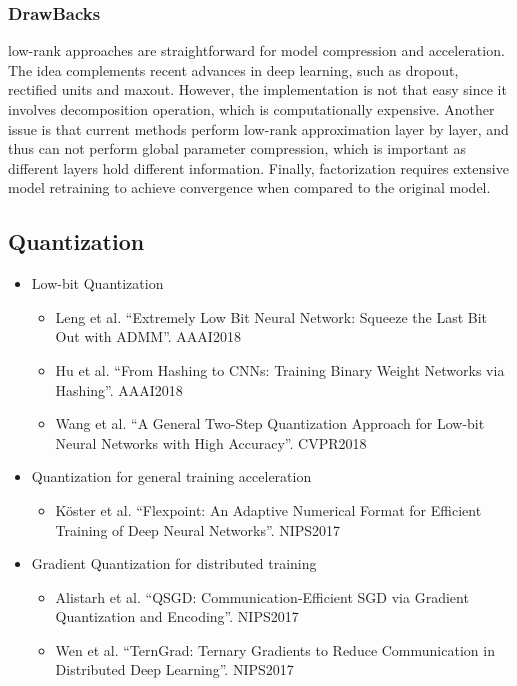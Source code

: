 \documentclass[a4paper]{article}
\begin{document}
			\subsubsection{DrawBacks}
				low-rank approaches are straightforward for
			model compression and acceleration. The idea complements
			recent advances in deep learning, such as dropout, rectified
			units and maxout. However, the implementation is not
			that easy since it involves decomposition operation, which
			is computationally expensive. Another issue is that current
			methods perform low-rank approximation layer by layer, and
			thus can not perform global parameter compression, which
			is important as different layers hold different information.
			Finally, factorization requires extensive model retraining to
			achieve convergence when compared to the original model.
		\subsection{Quantization}
			\begin{itemize}
				\item Low-bit Quantization
					\begin{itemize}
						\item Leng et al. “Extremely Low Bit Neural Network: Squeeze the Last Bit Out with ADMM”. AAAI2018
						\item Hu et al. “From Hashing to CNNs: Training Binary Weight Networks via Hashing”. AAAI2018
						\item Wang et al. “A General Two-Step Quantization Approach for Low-bit Neural Networks with High
						Accuracy”. CVPR2018
					\end{itemize}
				\item Quantization for general training acceleration
					\begin{itemize}
						\item Köster et al. “Flexpoint: An Adaptive Numerical Format for Efficient Training of Deep Neural
						Networks”. NIPS2017
					\end{itemize}
				\item Gradient Quantization for distributed training
					\begin{itemize}
						\item Alistarh et al. “QSGD: Communication-Efficient SGD via Gradient Quantization and Encoding”.
						NIPS2017
						\item Wen et al. “TernGrad: Ternary Gradients to Reduce Communication in Distributed Deep Learning”.
						NIPS2017
					\end{itemize}
			\end{itemize}			
\end{document}
